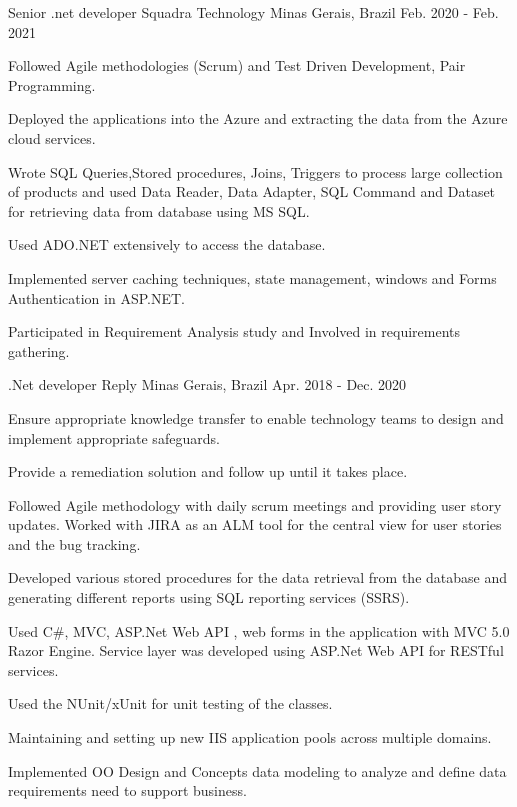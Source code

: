 \begin{cventries}
  \cventry
    {Senior .net developer} %
    {Squadra Technology} %
    {Minas Gerais, Brazil} %
    {Feb. 2020 - Feb. 2021} %
    {
      \begin{cvitems} %
        \item { Followed Agile methodologies (Scrum) and Test Driven Development, Pair Programming.}
        \item {Deployed the applications into the Azure and extracting the data from the Azure cloud services.}
        \item { Wrote SQL Queries,Stored procedures, Joins, Triggers to process large collection of products and used Data Reader, Data Adapter, SQL Command and Dataset for retrieving data from database using MS SQL.}
          \item {Used ADO.NET extensively to access the database.}
          \item {Implemented server caching techniques, state management, windows and Forms Authentication in ASP.NET.}
          \item {Participated in Requirement Analysis study and Involved in requirements gathering.}
      \end{cvitems}
    }

  \cventry
    {.Net developer} %
    {Reply} %
    {Minas Gerais, Brazil} %
    {Apr. 2018 - Dec. 2020} %
    {
      \begin{cvitems} %
        \item {Ensure appropriate knowledge transfer to enable technology teams to design and implement
appropriate safeguards.}
        \item {Provide a remediation solution and follow up until it takes place.}
        \item {Followed Agile methodology with daily scrum meetings and providing user story updates. Worked with JIRA as an ALM tool for the central view for user stories and the bug tracking.}
        \item {Developed various stored procedures for the data retrieval from the database and generating different reports using SQL reporting services (SSRS).}
        \item {Used C\#, MVC, ASP.Net Web API , web forms in the application with MVC 5.0 Razor Engine. Service layer was developed using ASP.Net Web API for RESTful services.}
        \item {Used the NUnit/xUnit for unit testing of the classes.}
        \item {Maintaining and setting up new IIS application pools across multiple domains.}
        \item {Implemented OO Design and Concepts data modeling to analyze and define data requirements need to support business.}
      \end{cvitems}
    }


\end{cventries}
